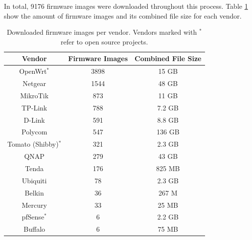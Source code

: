 In total, 9176 firmware images were downloaded throughout this process. Table \ref{tab:scraper} show the amount of firmware images and its combined file size for each vendor.

\begin{table}[H]
\centering
\caption{Downloaded firmware images per vendor. Vendors marked with $^*$ refer to open source projects.}
\begin{tabular}{|c|c|c|}
\hline
\textbf{Vendor} & \textbf{Firmware Images} & \textbf{Combined File Size} \\ \hline
OpenWrt$^*$     & 3898                     & 15 GB                       \\ 
Netgear         & 1544                     & 48 GB                       \\ 
MikroTik        & 873                      & 11 GB                       \\ 
TP-Link         & 788                      & 7.2 GB                      \\ 
D-Link          & 591                      & 8.8 GB                      \\ 
Polycom         & 547                      & 136 GB                      \\ 
Tomato (Shibby)$^*$ & 321                      & 2.3 GB                      \\ 
QNAP            & 279                      & 43 GB                       \\ 
Tenda           & 176                      & 825 MB                      \\ 
Ubiquiti        & 78                       & 2.3 GB                      \\ 
Belkin          & 36                       & 267 M                       \\ 
Mercury         & 33                       & 25 MB                       \\ 
pfSense$^*$     & 6                        & 2.2 GB                      \\ 
Buffalo         & 6                        & 75 MB                       \\ \hline

\end{tabular}
\label{tab:scraper}
\end{table}


